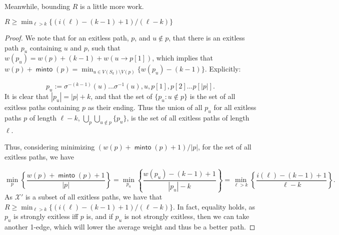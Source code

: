 \documentclass{article}
\DeclareMathOperator{\minto}{\bm{\mathsf{minto}}}
\newcommand{\edit}[1]{}%
\newcommand{\dc}[1]{}%
\begin{document}
\dc{ I would also suggest changing ``strongly exitless path'' to ``complete exitless path,'' since ``strongly'' is an adverb but isn't actually modifying the ``exitless'' part, so you should use an adjective instead. If you decide to change it, define ``complete'' entirely separately from ``exitless.'' This also saves you some words since often the distinction is just between exitless and strongly exitless, so you could say something like ``if it is also complete ...''}

\vspace{.75em}
Meanwhile, bounding $R$ is a little more work.
\begin{red} $R \geq \min_{\ell > k}\{(i(\ell)-(k-1)+1)/(\ell-k) \}$
\begin{proof}

We note that for an exitless path, $p$, and $u \not \in p$, that there is an exitless path $p_u$ containing $u$ and $p$, such that $w(p_u) = w(p) + (k-1)+w(u\to p[1])$, which implies that $w(p)+\minto(p) = \min_{u \in V(S_k) \setminus V(p)}\{w(p_u)-(k-1)\}$. Explicitly: 

\[p_u := \sigma^{-(k-1)}(u)\dots \sigma^{-1}(u), u, p[1],p[2]\dots p[|p|].\]
It is clear that $|p_u| = |p|+k$, and that the set of $\{p_u: u \not \in p\}$ is the set of all exitless paths containing $p$ as their ending. Thus the union of all $p_u$ for all exitless paths $p$ of length $\ell-k$\dc{ and choice of $u$}, $\bigcup_p \bigcup_{u\not \in p} \{p_u\}$\dc{ don't need to write this in notation}, is the set of all exitless paths of length $\ell$.

Thus, considering minimizing $(w(p)+\minto(p)+1)/|p|$, for the set of all exitless paths, we have

\[\min_p\left\{\frac{w(p)+\minto(p)+1}{|p|}\right\} = \min_{p_u}\left\{\frac{w(p_u)-(k-1)+1}{|p_u|-k}\right\} = \min_{\ell > k}\left\{\frac{i(\ell)-(k-1)+1}{\ell-k} \right\}.\]
As $\mathcal{X}'$ is a subset of all exitless paths, we have that $R \geq \min_{\ell > k}\{(i(\ell)-(k-1)+1)/(\ell-k) \}$. In fact, equality holds, as $p_u$ is strongly exitless iff $p$ is, and if $p_u$ is not strongly exitless, then we can take another 1-edge, which will lower the average weight and thus be a better path. \edit{ explain average weight a little more}
\end{proof}
\end{red}
\end{document}
